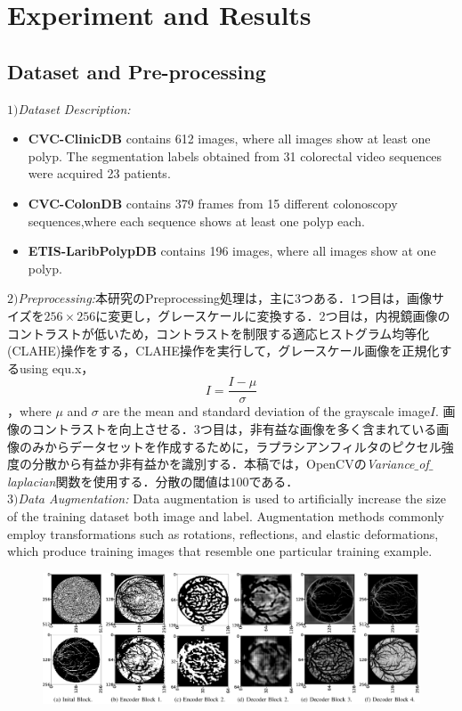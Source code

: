 \documentclass{article}
\begin{document}
\section{Experiment and Results}
\label{sec:res}
\subsection{Dataset and Pre-processing}
\(1)\){\it Dataset Description:}
\begin{itemize}
\item {\bf CVC-ClinicDB} contains 612 images, where all images show at least one polyp. The segmentation labels obtained from 31 colorectal video sequences were acquired 23 patients.
\item {\bf CVC-ColonDB} contains 379 frames from 15 different colonoscopy sequences,where each sequence shows at least one polyp each.
\item {\bf ETIS-LaribPolypDB} contains 196 images, where all images show at one polyp. 
\end{itemize}
\(2)\){\it Preprocessing:}本研究のPreprocessing処理は，主に3つある．1つ目は，画像サイズを$256\times256$に変更し，グレースケールに変換する．2つ目は，内視鏡画像のコントラストが低いため，コントラストを制限する適応ヒストグラム均等化(CLAHE)操作をする，CLAHE操作を実行して，グレースケール画像を正規化するusing equ.x，\begin{equation}
I=\frac{I-\mu}{\sigma}
\end{equation}，where $\mu$ and $\sigma$ are the mean and standard deviation of the grayscale image$I$. 画像のコントラストを向上させる．3つ目は，非有益な画像を多く含まれている画像のみからデータセットを作成するために，ラプラシアンフィルタのピクセル強度の分散から有益か非有益かを識別する．本稿では，OpenCVの{\it Variance$\_$of$\_$laplacian}関数を使用する．分散の閾値は$100$である．\\
\(3)\){\it Data Augmentation:} Data augmentation is used to artificially increase the size of the training dataset both image and label. Augmentation methods commonly employ transformations such as rotations, reflections, and elastic deformations, which produce training images that resemble one particular training example.
\begin{figure}[t]
\begin{center}
\includegraphics[width=180mm]{fig3.eps}
\caption{ }
\end{center}
\end{figure}
\end{document}
